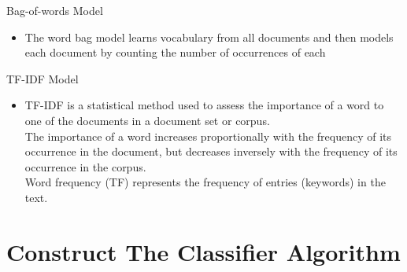 \documentclass[
 size=14pt,
 paper=smartboard,  %
 mode=present, 		%
 display=slides, 	%
 style=tuliplab,  	%
 pauseslide,
 fleqn,leqno]{powerdot}
\begin{document}
\begin{slide}{Bag-of-words Model}
  
  \begin{itemize}
  \item  
    The word bag model learns vocabulary from all documents and then models each document
    by counting the number of occurrences of each
  \end{itemize}
\end{slide}
\begin{slide}{TF-IDF Model}
  
  \begin{itemize}
  \item  
    TF-IDF is a statistical method used to assess the importance of a word to one of the documents 
    in a document set or corpus.
    \\The importance of a word increases proportionally with the frequency of its occurrence in the document, 
    but decreases inversely with the frequency of its occurrence in the corpus.
    \\Word frequency (TF) represents the frequency of entries (keywords) in the text.
  \end{itemize}
\end{slide}

\section{Construct The Classifier Algorithm}

\end{document}
